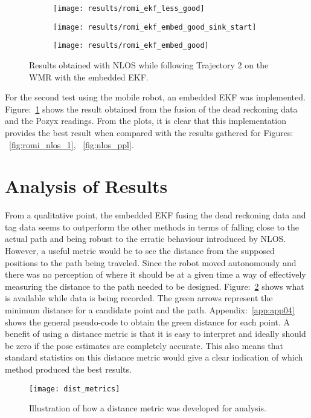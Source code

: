 \begin{figure}[ht!]
    \centering
    \begin{subfigure}{0.65\textwidth}
            \texttt{[image: results/romi\_ekf\_less\_good]}
    \end{subfigure}
    \begin{subfigure}{0.65\textwidth}
            \texttt{[image: results/romi\_ekf\_embed\_good\_sink\_start]}
    \end{subfigure}
    \begin{subfigure}{0.65\textwidth}
            \texttt{[image: results/romi\_ekf\_embed\_good]}
    \end{subfigure}
    \caption{Results obtained with NLOS while following Trajectory 2 on the WMR with the embedded EKF.}
    \label{fig:romi_nlos_ekf}
\end{figure}
For the second test using the mobile robot, an embedded EKF was implemented.
Figure:~\ref{fig:romi_nlos_ekf} shows the result obtained from the fusion of the dead reckoning data and the Pozyx readings.
From the plots, it is clear that this implementation provides the best result when compared with the results gathered for Figures: ~\ref{fig:romi_nlos_1}, ~\ref{fig:nlos_ppl}.


\section{Analysis of Results}\label{sec:analysis-of-results}
From a qualitative point, the embedded EKF fusing the dead reckoning data and tag data seems to outperform the other methods in terms of falling close to the actual path and being robust to the erratic behaviour introduced by NLOS.
However, a useful metric would be to see the distance from the supposed positions to the path being traveled.
Since the robot moved autonomously and there was no perception of where it should be at a given time a way of effectively measuring the distance to the path needed to be designed.
Figure:~\ref{fig:dist} shows what is available while data is being recorded.
The green arrows represent the minimum distance for a candidate point and the path.
Appendix:~\ref{app:app04} shows the general pseudo-code to obtain the green distance for each point.
A benefit of using a distance metric is that it is easy to interpret and ideally should be zero if the pose estimates are completely accurate.
This also means that standard statistics on this distance metric would give a clear indication of which method produced the best results.
\begin{figure}[ht!]
    \centering
    \texttt{[image: dist\_metrics]}
    \caption{Illustration of how a distance metric was developed for analysis.}
    \label{fig:dist}
\end{figure}

